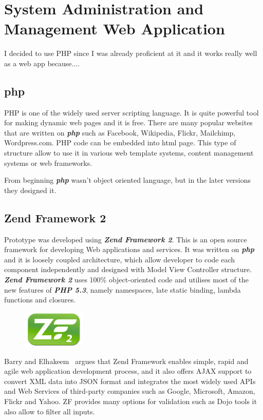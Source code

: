   \section{System Administration and Management Web Application}	%
I decided to use PHP since I was already proficient at it and it works really well as a web app because....
    \subsection{php}
PHP is one of the widely used server scripting language. It is quite powerful tool for making dynamic web pages and it is free. There are many popular websites that are written on \textbf{\textit{php}} such as Facebook, Wikipedia, Flickr, Mailchimp, Wordpress.com. PHP code can be embedded into html page. This type of structure allow to use it in various web template systems, content management systems or web frameworks.

From beginning \textbf{\textit{php}} wasn't object oriented language, but in the later versions they designed it.

    \subsection{Zend Framework 2}
Prototype was developed using \textbf{\textit{Zend Framework 2}}. This is an open source framework for developing Web applications and services. It was written on \textbf{\textit{php}} and it is loosely coupled architecture, which allow developer to code each component independently and designed with Model View Controller structure. \textbf{\textit{Zend Framework 2}} uses 100\% object-oriented code and utilises most of the new features of \textbf{\textit{PHP 5.3}}, namely namespaces, late static binding, lambda functions and closures.~\cite{ZendFramework-Website-About}

\begin{figure}
	\includegraphics[width=3cm]{img/zf2/zf2-logo.png}
\end{figure} 
Barry and Elhakeem~\cite{ZendFramework-Security-Model} argues that Zend Framework enables simple, rapid and agile web application development process, and it also offers AJAX support to convert XML data into JSON format and integrates the most widely used APIs and Web Services of third-party companies such as Google, Microsoft, Amazon, Flickr and Yahoo. ZF provides many options for validation such as Dojo tools it also allow to filter all inputs.

